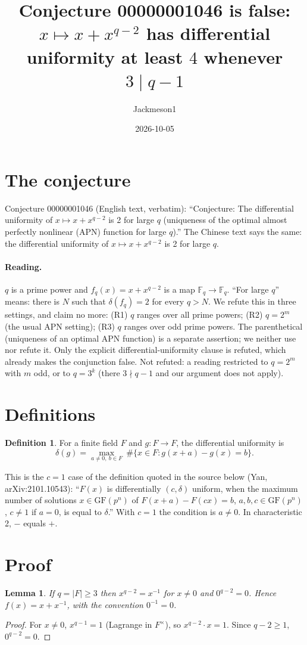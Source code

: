 \documentclass[11pt]{article}
\title{Conjecture 00000001046 is false:\\ $x\mapsto x+x^{q-2}$ has differential uniformity at least $4$ whenever $3\mid q-1$}
\author{Jackmeson1}
\date{2026-10-05}
\newtheorem{lemma}[theorem]{Lemma}
\theoremstyle{definition}
\newtheorem{definition}[theorem]{Definition}
\begin{document}
\maketitle

\section{The conjecture}
Conjecture 00000001046 (English text, verbatim): ``Conjecture: The differential uniformity of
$x \mapsto x + x^{q-2}$ is 2 for large $q$ (uniqueness of the optimal almost perfectly nonlinear
(APN) function for large $q$).'' The Chinese text says the same: the differential uniformity of
$x\mapsto x+x^{q-2}$ is 2 for large $q$.

\paragraph{Reading.} $q$ is a prime power and $f_q(x)=x+x^{q-2}$ is a map
$\mathbb F_q\to\mathbb F_q$. ``For large $q$'' means: there is $N$ such that
$\delta(f_q)=2$ for every $q>N$. We refute this in three settings, and claim no more:
(R1) $q$ ranges over all prime powers; (R2) $q=2^m$ (the usual APN setting); (R3) $q$ ranges over
odd prime powers. The parenthetical (uniqueness of an optimal APN function) is a separate assertion; we
neither use nor refute it. Only the explicit differential-uniformity clause is refuted, which already
makes the conjunction false. Not refuted: a reading restricted to $q=2^m$ with
$m$ odd, or to $q=3^k$ (there $3\nmid q-1$ and our argument does not apply).

\section{Definitions}
\begin{definition}
For a finite field $F$ and $g:F\to F$, the differential uniformity is
\[ \delta(g)=\max_{a\ne 0,\ b\in F}\ \#\{x\in F : g(x+a)-g(x)=b\}. \]
\end{definition}
This is the $c=1$ case of the definition quoted in the source below (Yan, arXiv:2101.10543):
``$F(x)$ is differentially $(c,\delta)$ uniform, when the maximum number of solutions
$x\in\mathrm{GF}(p^n)$ of $F(x+a)-F(cx)=b$, $a,b,c\in\mathrm{GF}(p^n)$, $c\neq1$ if $a=0$, is
equal to $\delta$.'' With $c=1$ the condition is $a\ne0$. In characteristic 2, $-$ equals $+$.

\section{Proof}
\begin{lemma}\label{lem:inv}
If $q=|F|\ge 3$ then $x^{q-2}=x^{-1}$ for $x\ne0$ and $0^{q-2}=0$. Hence $f(x)=x+x^{-1}$, with
the convention $0^{-1}=0$.
\end{lemma}
\begin{proof}
For $x\ne0$, $x^{q-1}=1$ (Lagrange in $F^\times$), so $x^{q-2}\cdot x=1$. Since $q-2\ge1$,
$0^{q-2}=0$.
\end{proof}
\end{document}
